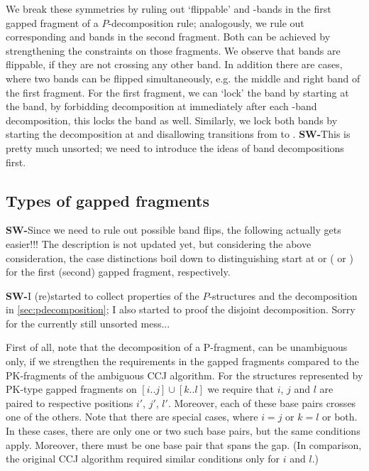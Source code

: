 \documentclass[11pt]{article} %
\newcommand{\SW}[1]{\textbf{SW-}#1}
\newcommand{\Ob}{\text{O}}
\newcommand{\Rb}{\text{R}}
\newcommand{\Lb}{\text{L}}
\newcommand{\Mb}{\text{M}}
\begin{document}
We break these symmetries by ruling out `flippable' \Rb{} and \Mb-bands in the first gapped fragment of a $P$-decomposition rule; analogously, we rule out corresponding \Lb{} and \Mb{} bands in the second fragment. Both can be achieved by strengthening the constraints on those fragments.
We observe that bands are flippable, if they are not crossing any other band. In addition there are cases, where two bands can be flipped simultaneously, e.g. the middle and right band of the first fragment.
For the first fragment, we can `lock' the \Mb{} band by starting at the \Lb{} band, by forbidding decomposition at \Rb{} immediately after each \Lb-band decomposition, this locks the \Rb{} band as well. Similarly, we lock both bands by starting the decomposition at \Ob{} and disallowing transitions from \Ob{} to \Mb. \SW{This is pretty much unsorted; we need to introduce the ideas of band decompositions first.}

\subsection{Types of gapped fragments}

\SW{Since we need to rule out possible band flips, the following actually gets easier!!! The description is not updated yet, but considering the above consideration, the case distinctions boil down to distinguishing start at \Ob{} or \Lb{} (\Ob{} or \Rb{}) for the first (second) gapped fragment, respectively.}

\SW{I (re)started to collect properties of the $P$-structures and the decomposition in 
\ref{sec:pdecomposition}; I also started to proof the disjoint decomposition. Sorry for the currently still unsorted mess...}

First of all, note that the decomposition of a P-fragment, can be unambiguous
only, if we strengthen the requirements in the gapped fragments compared to the
PK-fragments of the ambiguous CCJ algorithm.  For the structures represented by
PK-type gapped fragments on $[i..j]\cup[k..l]$ we require that $i$, $j$ and $l$
are paired to respective positions $i'$, $j'$, $l'$. Moreover, each of these
base pairs crosses one of the others.  Note that there are special
cases, where $i=j$ or $k=l$ or both. In these cases, there are only one or two
such base pairs, but the same conditions apply. Moreover, there must be one
base pair that spans the gap. (In comparison, the original CCJ algorithm
required similar conditions only for $i$ and $l$.)
\end{document}
